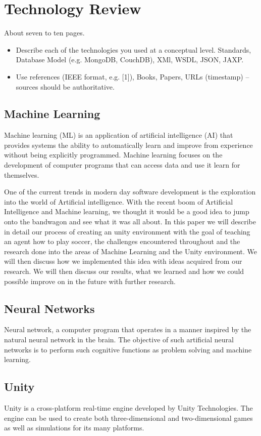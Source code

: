 
\chapter{Technology Review}
About seven to ten pages.
\begin{itemize}
\item Describe each of the technologies you used at a conceptual level. Standards, Database Model (e.g. MongoDB, CouchDB), XMl, WSDL, JSON, JAXP.
\item Use references (IEEE format, e.g. [1]), Books, Papers, URLs (timestamp) – sources should be authoritative. 
\end{itemize}

\section{Machine Learning}
Machine learning (ML) is an application of artificial intelligence (AI) that provides systems the ability to automatically learn and improve from experience without being explicitly programmed. Machine learning focuses on the development of computer programs that can access data and use it learn for themselves.

One of the current trends in modern day software development is the exploration into the world of Artificial intelligence.
With the recent boom of Artificial Intelligence and Machine learning, we thought it would be a good idea to jump onto the bandwagon and see what it was all about.
In this paper we will describe in detail our process of creating an unity environment with the goal of teaching an agent how to play soccer, the challenges encountered throughout and the research done into the areas of Machine Learning and the Unity environment.  We will then discuss how we implemented this idea with ideas acquired from our research. We will then discuss our results, what we learned and how we could possible improve on in the future with further research.

\section{Neural Networks}
Neural network, a computer program that operates in a manner inspired by the natural neural network in the brain. The objective of such artificial neural networks is to perform such cognitive functions as problem solving and machine learning.
\section{Unity}
Unity is a cross-platform real-time engine developed by Unity Technologies. The engine can be used to create both three-dimensional and two-dimensional games as well as simulations for its many platforms.

